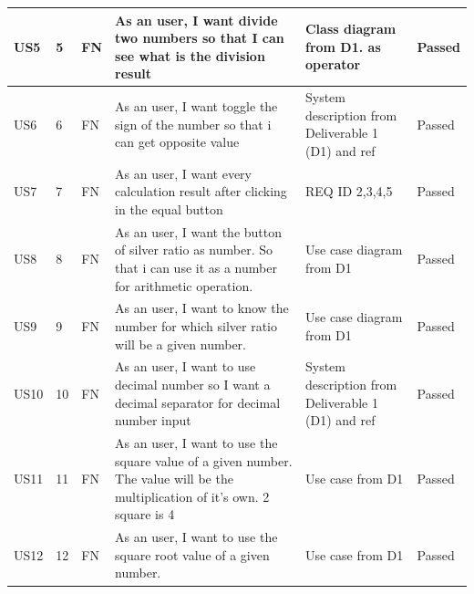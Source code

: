 \documentclass{article}
\begin{document}
\begin{tabular}{ |p{1cm}|p{1cm}|p{1cm}|p{3cm}|p{3cm}|p{2cm}| }
 \hline
  US5 & 5 & FN & As  an  user,  I  want  divide  two
numbers so that I can see what
is the division result & Class diagram from D1. as operator  & Passed \\
 \hline
 US6 & 6 & FN & As an user, I want toggle the sign
of the number so that i can get
opposite value & System description from Deliverable 1 (D1) and ref \cite{cal_story}  & Passed \\
 \hline
 US7 & 7 & FN & As  an  user,  I  want  every  calculation result after clicking in the
equal button & REQ ID 2,3,4,5  & Passed \\
 \hline
 US8 & 8 & FN & As an user, I want the button of
silver ratio as number.  So that i
can use it as a number for arithmetic operation. & Use case diagram from D1  & Passed \\
 \hline
 US9 & 9 & FN & As an  user,  I want  to know the
number for which silver ratio will
be a given number. & Use case diagram from D1  & Passed \\
 \hline
 US10 & 10 & FN & As an user, I want to use decimal
number so I want a decimal separator for decimal number input & System description from Deliverable 1 (D1) and ref \cite{js_story}  & Passed \\
\hline
 US11 & 11 & FN & As  an  user,  I  want  to  use  the
square value of a given number. The value will be the
multiplication of it’s own.  2 square is 4 & Use case from D1  & Passed \\
 \hline
 US12 & 12 & FN & As  an  user,  I  want  to  use  the
square root value of a given number. & Use case from D1 & Passed \\
\hline
\end{tabular}
\end{document}
